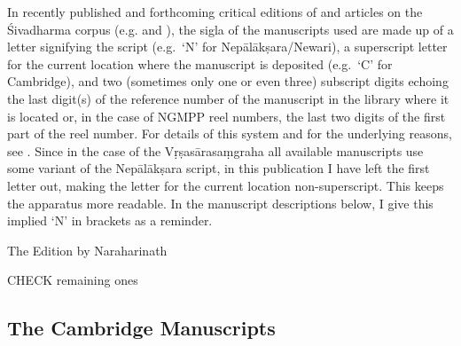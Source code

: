\documentclass[11pt]{book}
\begin{document}
In recently published and forthcoming critical editions of and articles
on the Śivadharma corpus 
(e.g.  and 
), 
the sigla of the manuscripts
used are made up of a letter signifying the script (e.g.~`N' for
Nepālākṣara/Newari), a superscript letter for the current location where
the manuscript is deposited (e.g.~`C' for Cambridge), and two (sometimes
only one or even three) subscript digits echoing the last digit(s) of
the reference number of the manuscript in the library where it is
located or, in the case of NGMPP reel numbers, the last two digits of
the first part of the reel number. For details of this system and for
the underlying reasons, see 
. 
Since in the case of the Vṛṣasārasaṃgraha all available manuscripts use some variant
of the Nepālākṣara script, in this publication I have left the first
letter out, making the letter for the current location non-superscript.
This keeps the apparatus more readable. In the manuscript descriptions
below, I give this implied `N' in brackets as a reminder.

{The Edition by Naraharinath}

{CHECK remaining ones}




\subsection{The Cambridge Manuscripts}
\end{document}
